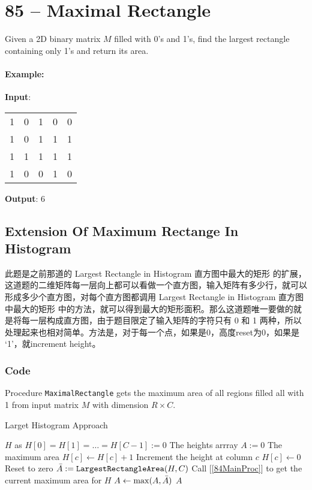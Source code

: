 \section{85 -- Maximal Rectangle}
Given a 2D binary matrix $M$ filled with 0's and 1's, find the largest rectangle containing only 1's and return its area.
\paragraph{Example:}
\begin{flushleft}
\textbf{Input}:
\begin{table}[H]
\begin{tabular}{lllll}
1 & 0 & 1 & 0 & 0 \\
1 & 0 & {\color{red}1} & {\color{red}1} & {\color{red}1} \\
1 & 1 & {\color{red}1} & {\color{red}1} & {\color{red}1} \\
1 & 0 & 0 & 1 & 0
\end{tabular}
\end{table}
\textbf{Output}: 6
\end{flushleft}
\subsection{Extension Of Maximum Rectange In Histogram}
\begin{CJK*}{UTF8}{gbsn}
此题是之前那道的 Largest Rectangle in Histogram 直方图中最大的矩形 的扩展，这道题的二维矩阵每一层向上都可以看做一个直方图，输入矩阵有多少行，就可以形成多少个直方图，对每个直方图都调用 Largest Rectangle in Histogram 直方图中最大的矩形 中的方法，就可以得到最大的矩形面积。那么这道题唯一要做的就是将每一层构成直方图，由于题目限定了输入矩阵的字符只有 0 和 1 两种，所以处理起来也相对简单。方法是，对于每一个点，如果是0，高度reset为0，如果是 ‘1’，就increment height。
\end{CJK*}
\subsubsection{Code}
Procedure \texttt{MaximalRectangle} gets the maximum area of all regions filled all with 1 from input matrix $M$ with dimension $R\times C$.
\setcounter{algorithm}{0}
\begin{algorithm}[H]
\caption{Larget Histogram Approach}
\begin{algorithmic}[1]
\State $H$ as $H[0]=H[1]=\ldots=H[C-1] :=0$ \Comment The heights arrray
\State $A:=0$ \Comment The maximum area
\State $H[c]\gets H[c] + 1$ \Comment Increment the height at column $c$
\Else
\State $H[c]\gets 0$  \Comment Reset to zero
\EndIf
\EndFor
\State $\Bar{A}:=\texttt{LargestRectangleArea}(H, C)$ \Comment Call [\ref{84MainProc}] to get the current maximum area for $H$
\State $A\gets \max(A, \Bar{A})$
\EndFor
\State \Return $A$
\EndProcedure
\end{algorithmic}
\end{algorithm}
